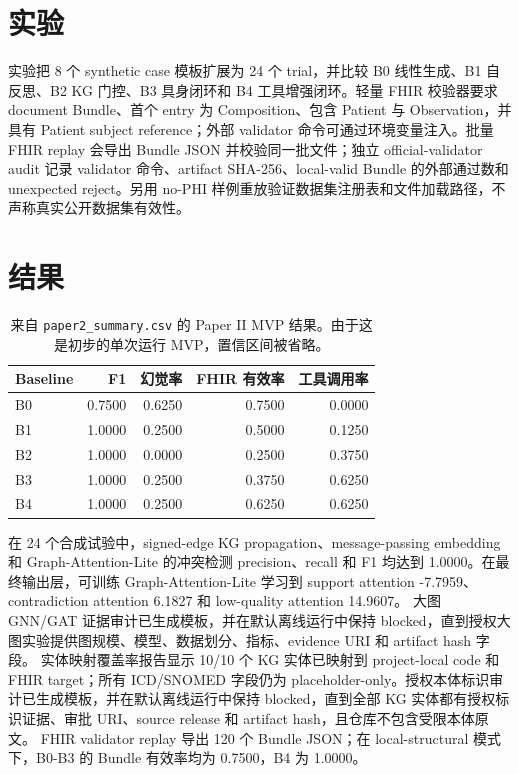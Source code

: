 \documentclass[11pt]{article}
\begin{document}
\section{实验}
实验把 8 个 synthetic case 模板扩展为 24 个 trial，并比较 B0 线性生成、B1 自反思、B2 KG 门控、B3 具身闭环和 B4 工具增强闭环。轻量 FHIR 校验器要求 document Bundle、首个 entry 为 Composition、包含 Patient 与 Observation，并具有 Patient subject reference；外部 validator 命令可通过环境变量注入。批量 FHIR replay 会导出 Bundle JSON 并校验同一批文件；独立 official-validator audit 记录 validator 命令、artifact SHA-256、local-valid Bundle 的外部通过数和 unexpected reject。另用 no-PHI 样例重放验证数据集注册表和文件加载路径，不声称真实公开数据集有效性。

\section{结果}
\begin{table}[h]
\centering
\caption{来自 \texttt{paper2\_summary.csv} 的 Paper II MVP 结果。由于这是初步的单次运行 MVP，置信区间被省略。}
\begin{tabular}{lrrrr}
\toprule
Baseline & F1 & 幻觉率 & FHIR 有效率 & 工具调用率 \\
\midrule
B0 & 0.7500 & 0.6250 & 0.7500 & 0.0000 \\
B1 & 1.0000 & 0.2500 & 0.5000 & 0.1250 \\
B2 & 1.0000 & 0.0000 & 0.2500 & 0.3750 \\
B3 & 1.0000 & 0.2500 & 0.3750 & 0.6250 \\
B4 & 1.0000 & 0.2500 & 0.6250 & 0.6250 \\
\bottomrule
\end{tabular}
\end{table}
在 24 个合成试验中，signed-edge KG propagation、message-passing embedding 和 Graph-Attention-Lite 的冲突检测 precision、recall 和 F1 均达到 1.0000。在最终输出层，可训练 Graph-Attention-Lite 学习到 support attention -7.7959、contradiction attention 6.1827 和 low-quality attention 14.9607。
大图 GNN/GAT 证据审计已生成模板，并在默认离线运行中保持 blocked，直到授权大图实验提供图规模、模型、数据划分、指标、evidence URI 和 artifact hash 字段。
实体映射覆盖率报告显示 10/10 个 KG 实体已映射到 project-local code 和 FHIR target；所有 ICD/SNOMED 字段仍为 placeholder-only。授权本体标识审计已生成模板，并在默认离线运行中保持 blocked，直到全部 KG 实体都有授权标识证据、审批 URI、source release 和 artifact hash，且仓库不包含受限本体原文。
FHIR validator replay 导出 120 个 Bundle JSON；在 local-structural 模式下，B0-B3 的 Bundle 有效率均为 0.7500，B4 为 1.0000。
\end{document}
